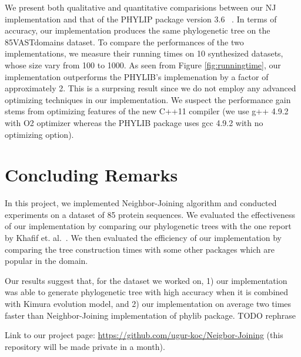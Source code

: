 \documentclass[11pt,letterpaper]{article}
\theoremstyle{definition}
\begin{document}
We present both qualitative and quantitative comparisions between our NJ implementation and that of the PHYLIP package version 3.6 ~\cite{felsenstein2005phylip}. In terms of accuracy, our implementation produces the same phylogenetic tree on the 85VASTdomains dataset. To compare the performances of the two implementations, we measure their running times on 10 synthesized datasets, whose size vary from 100 to 1000. As seen from Figure \ref{fig:runningtime}, our implementation outperforms the PHYLIB's implemenation by a factor of approximately 2. This is a surprsing result since we do not employ any advanced optimizing techniques in our implementation. We suspect the performance gain stems from optimizing features of the new C++11 compiler (we use g++ 4.9.2 with O2 optimizer whereas the PHYLIB package uses gcc 4.9.2 with no optimizing option).  

\section{Concluding Remarks}

In this project, we implemented Neighbor-Joining algorithm and conducted experiments on a dataset of 85 protein sequences. We evaluated the effectiveness of our implementation by comparing our phylogenetic trees with the one report by Khafif et. al.~\cite{khafif2014identification}. We then evaluated the efficiency of our implementation by comparing the tree construction times with some other packages which are popular in the domain.

Our results suggest that, for the dataset we worked on, 1) our implementation was able to generate phylogenetic tree with high accuracy when it is combined with Kimura evolution model, and 2) our implementation on average two times faster than Neighbor-Joining implementation of phylib package. TODO rephrase


Link to our project page: \url{https://github.com/ugur-koc/Neigbor-Joining} (this repository will be made private in a month).



\end{document}
